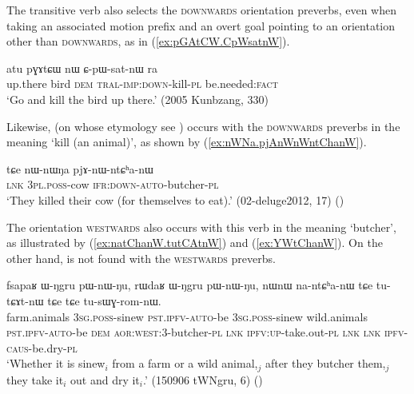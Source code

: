 The transitive verb  also selects the \textsc{downwards} orientation preverbs, even when taking an associated motion prefix and an overt goal pointing to an orientation other than \textsc{downwards}, as in (\ref{ex:pGAtCW.CpWsatnW}).

\begin{exe}
\ex \label{ex:pGAtCW.CpWsatnW}
\gll  atu pɣɤtɕɯ nɯ ɕ-pɯ-sat-nɯ ra \\
up.there bird \textsc{dem} \textsc{tral}-\textsc{imp}:\textsc{down}-kill-\textsc{pl} be.needed:\textsc{fact} \\
\glt `Go and kill the bird up there.' (2005 Kunbzang, 330)
   \end{exe} 
   
Likewise,  (on whose etymology see \citealt[303--309]{gong18these}) occurs with the \textsc{downwards} preverbs in the meaning `kill (an animal)', as shown by (\ref{ex:nWNa.pjAnWnWntChanW}). 

\begin{exe}
\ex \label{ex:nWNa.pjAnWnWntChanW}
\gll  tɕe nɯ-nɯŋa pjɤ-nɯ-ntɕʰa-nɯ \\
\textsc{lnk} \textsc{3pl}.\textsc{poss}-cow \textsc{ifr}:\textsc{down}-\textsc{auto}-butcher-\textsc{pl} \\
\glt `They killed their cow (for themselves to eat).' (02-deluge2012, 17) ()
\end{exe} 

The orientation \textsc{westwards} also occurs with this verb in the meaning `butcher', as illustrated by (\ref{ex:natChanW.tutCAtnW}) and (\ref{ex:YWtChanW}). On the other hand,  is not found with the \textsc{westwards} preverbs.

\begin{exe}
\ex \label{ex:natChanW.tutCAtnW}
\gll fsapaʁ ɯ-ŋgru pɯ-nɯ-ŋu, rɯdaʁ ɯ-ŋgru pɯ-nɯ-ŋu,  nɯnɯ na-ntɕʰa-nɯ tɕe tu-tɕɤt-nɯ tɕe tɕe tu-sɯɣ-rom-nɯ. \\
farm.animals \textsc{3sg}.\textsc{poss}-sinew  \textsc{pst}.\textsc{ipfv}-\textsc{auto}-be  \textsc{3sg}.\textsc{poss}-sinew  wild.animals \textsc{pst}.\textsc{ipfv}-\textsc{auto}-be \textsc{dem} \textsc{aor}:\textsc{west}:3\flobv{}-butcher-\textsc{pl} \textsc{lnk} \textsc{ipfv}:\textsc{up}-take.out-\textsc{pl} \textsc{lnk} \textsc{lnk} \textsc{ipfv}-\textsc{caus}-be.dry-\textsc{pl} \\
\glt `Whether it is sinew$_i$ from a farm or a wild animal,$_j$  after they butcher them,$_j$ they take it$_i$ out and dry it$_i$.' (150906 tWNgru, 6) ()
\end{exe} 

